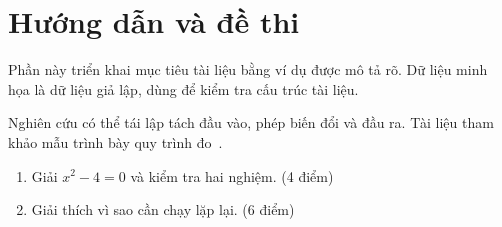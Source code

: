 \section{Hướng dẫn và đề thi}


\label{sec:chapter1}
Phần này triển khai mục tiêu tài liệu bằng ví dụ được mô tả rõ. Dữ liệu minh họa là dữ liệu giả lập, dùng để kiểm tra cấu trúc tài liệu.

Nghiên cứu có thể tái lập tách đầu vào, phép biến đổi và đầu ra. Tài liệu tham khảo mẫu trình bày quy trình đo~\cite{example}.
\begin{enumerate}
\item Giải $x^2-4=0$ và kiểm tra hai nghiệm. (4 điểm)
\item Giải thích vì sao cần chạy lặp lại. (6 điểm)
\end{enumerate}

